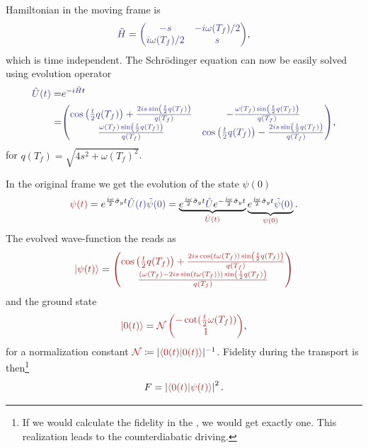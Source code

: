 Hamiltonian in the moving frame is
\begin{equation}
    \bluee{\tilde H}=\bluee{\begin{pmatrix}
        -s&-i\omega(T_f)/2\\
        i\omega(T_f)/2&s
    \end{pmatrix}},
\end{equation}
which is time independent. The Schr\"odinger equation can now be easily solved using evolution operator
\begin{equation}
    \begin{split}
        \bluee{\UU(t)}=&e^{-i\bluee{\tilde H}t}\\
        =&\bluee{\begin{pmatrix}
            \cos \left(\frac{t}{2} q(T_f)\right)+\frac{2 i s \sin \left(\frac{t}{2} q(T_f)\right)}{q(T_f)} & -\frac{\omega(T_f)  \sin \left(\frac{t}{2} q(T_f)\right)}{q(T_f)} \\
            \frac{\omega(T_f)  \sin \left(\frac{t}{2} q(T_f)\right)}{q(T_f)} & \cos \left(\frac{t}{2} q(T_f)\right)-\frac{2 i s \sin \left(\frac{t}{2} q(T_f)\right)}{q(T_f)} \\
        \end{pmatrix}},
    \end{split}
    \label{eq:evolutionBlue}
\end{equation}
for $q(T_f)=\sqrt{4 s^2+\omega(T_f) ^2}$.

In the original frame we get the evolution of the state $\psi(0)$
\begin{equation}
    \redd{\psi(t)}=\expsp \bluee{\UU(t) \tilde\psi(0)} = \underbrace{\expsp \bluee{\UU}\expsm}_{\redd{\UU(t)}} \underbrace{\expsp \bluee{\tilde\psi(0)}}_{\redd{\psi(0)}}.
\end{equation}
The evolved wave-function the reads as
\begin{equation}
    \redd{\ket{\psi(t)}}=\redd{\begin{pmatrix}
        \cos \left(\frac{t}{2} q(T_f)\right)+\frac{2 i s \cos (t \omega(T_f) ) \sin \left(\frac{t}{2} q(T_f)\right)}{q(T_f)}\\
        \frac{(\omega(T_f) -2 i s \sin (t \omega(T_f) )) \sin \left(\frac{t}{2} q(T_f)\right)}{q(T_f)}
    \end{pmatrix}}
\end{equation}
and the ground state
\begin{equation}
    \redd{\ket{0(t)}}=\redd{\mathcal{N}\begin{pmatrix}
        -\cot (\frac{t}{2}\omega(T_f))\\
        1
    \end{pmatrix}},
\end{equation}
for a normalization constant $\redd{\mathcal{N}}\coloneqq |\redd{\braket{0(t)|0(t)}}|^{-1}$.
Fidelity during the transport is then\footnote{If we would calculate the fidelity in the , we would get exactly one. This realization leads to the counterdiabatic driving.}
\begin{equation}
    F=\left|\redd{\braket{0(t)|\psi(t)}}\right|^2.
    \label{fid:definition}
\end{equation}

